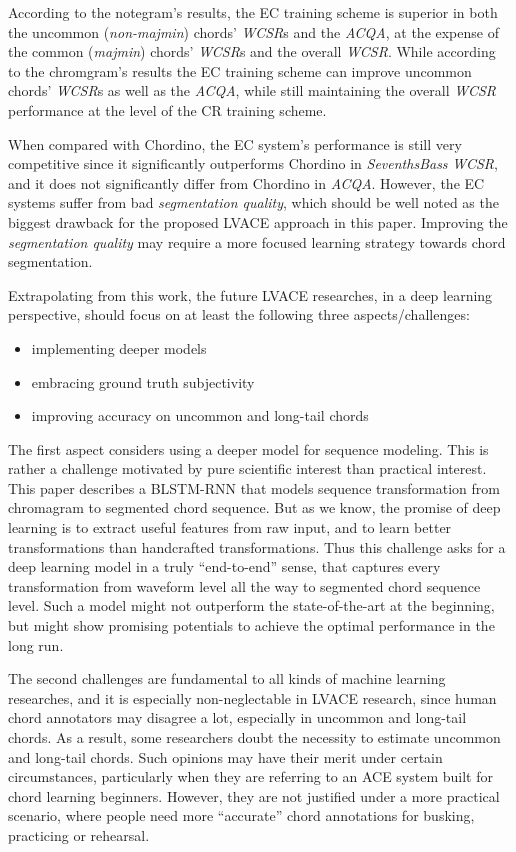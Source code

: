 According to the notegram's results, the EC training scheme is superior in both the uncommon (\textit{non-majmin}) chords' \textit{WCSR}s and the \textit{ACQA}, at the expense of the common (\textit{majmin}) chords' \textit{WCSR}s and the overall \textit{WCSR}. While according to the chromgram's results the EC training scheme can improve uncommon chords' \textit{WCSR}s as well as the \textit{ACQA}, while still maintaining the overall \textit{WCSR} performance at the level of the CR training scheme.

When compared with Chordino, the EC system's performance is still very competitive since it significantly outperforms Chordino in \textit{SeventhsBass} \textit{WCSR}, and it does not significantly differ from Chordino in \textit{ACQA}. However, the EC systems suffer from bad \textit{segmentation quality}, which should be well noted as the biggest drawback for the proposed LVACE approach in this paper. Improving the \textit{segmentation quality} may require a more focused learning strategy towards chord segmentation.

Extrapolating from this work, the future LVACE researches, in a deep learning perspective, should focus on at least the following three aspects/challenges:
\begin{itemize}
	\item implementing deeper models
	\item embracing ground truth subjectivity
	\item improving accuracy on uncommon and long-tail chords
\end{itemize}

The first aspect considers using a deeper model for sequence modeling. This is rather a challenge motivated by pure scientific interest than practical interest. This paper describes a BLSTM-RNN that models sequence transformation from chromagram to segmented chord sequence. But as we know, the promise of deep learning is to extract useful features from raw input, and to learn better transformations than handcrafted transformations. Thus this challenge asks for a deep learning model in a truly ``end-to-end'' sense, that captures every transformation from waveform level all the way to segmented chord sequence level. Such a model might not outperform the state-of-the-art at the beginning, but might show promising potentials to achieve the optimal performance in the long run.

The second challenges are fundamental to all kinds of machine learning researches, and it is especially non-neglectable in LVACE research, since human chord annotators may disagree a lot, especially in uncommon and long-tail chords. As a result, some researchers doubt the necessity to estimate uncommon and long-tail chords. Such opinions may have their merit under certain circumstances, particularly when they are referring to an ACE system built for chord learning beginners. However, they are not justified under a more practical scenario, where people need more ``accurate'' chord annotations for busking, practicing or rehearsal.

